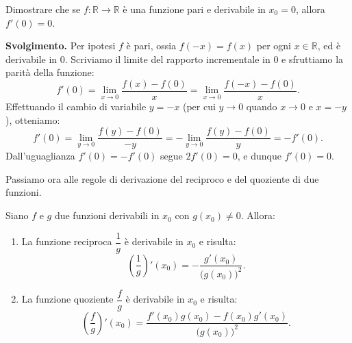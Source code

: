 \begin{esbox}
Dimostrare che se $f \colon \mathbb{R} \to \mathbb{R}$ è una funzione pari e derivabile in $x_0 = 0$, allora $f'(0) = 0$.

\medskip
\noindent\textbf{Svolgimento.}
Per ipotesi $f$ è pari, ossia $f(-x) = f(x)$ per ogni $x \in \mathbb{R}$, ed è derivabile in $0$. Scriviamo il limite del rapporto incrementale in $0$ e sfruttiamo la parità della funzione:
\[
    f'(0) = \lim_{x \to 0} \frac{f(x) - f(0)}{x} = \lim_{x \to 0} \frac{f(-x) - f(0)}{x}.
\]
Effettuando il cambio di variabile $y = -x$ (per cui $y \to 0$ quando $x \to 0$ e $x = -y$), otteniamo:
\[
    f'(0) = \lim_{y \to 0} \frac{f(y) - f(0)}{-y} = -\lim_{y \to 0} \frac{f(y) - f(0)}{y} = -f'(0).
\]
Dall'uguaglianza $f'(0) = -f'(0)$ segue $2f'(0) = 0$, e dunque $f'(0) = 0$.
\end{esbox}

Passiamo ora alle regole di derivazione del reciproco e del quoziente di due funzioni.

\begin{propbox}
Siano $f$ e $g$ due funzioni derivabili in $x_0$ con $g(x_0) \neq 0$. Allora:
\begin{enumerate}
    \item La funzione reciproca $\dfrac{1}{g}$ è derivabile in $x_0$ e risulta:
    \[
        \left(\frac{1}{g}\right)'(x_0) = -\frac{g'(x_0)}{\bigl(g(x_0)\bigr)^2}.
    \]
    \item La funzione quoziente $\dfrac{f}{g}$ è derivabile in $x_0$ e risulta:
    \[
        \left(\frac{f}{g}\right)'(x_0) = \frac{f'(x_0)g(x_0) - f(x_0)g'(x_0)}{\bigl(g(x_0)\bigr)^2}.
    \]
\end{enumerate}
\end{propbox}

